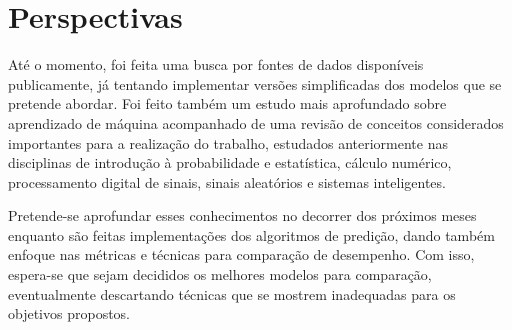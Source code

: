 \chapter[Perspectivas]{Perspectivas}

Até o momento, foi feita uma busca por fontes de dados disponíveis publicamente, já tentando implementar versões simplificadas dos modelos que se pretende abordar. Foi feito também um estudo mais aprofundado sobre aprendizado de máquina acompanhado de uma revisão de conceitos considerados importantes para a realização do trabalho, estudados anteriormente nas disciplinas de introdução à probabilidade e estatística, cálculo numérico, processamento digital de sinais, sinais aleatórios e sistemas inteligentes.

Pretende-se aprofundar esses conhecimentos no decorrer dos próximos meses enquanto são feitas implementações dos algoritmos de predição, dando também enfoque nas métricas e técnicas para comparação de desempenho.
Com isso, espera-se que sejam decididos os melhores modelos para comparação, eventualmente descartando técnicas que se mostrem inadequadas para os objetivos propostos.
